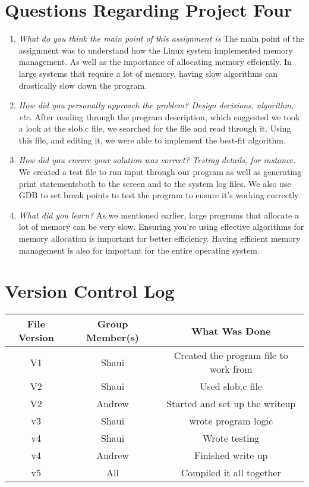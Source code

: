 \section{Questions Regarding Project Four}
\begin{enumerate}

   \item \textit{What do you think the main point of this assignment is} The main point of the assignment was to understand how the Linux system implemented memory management. As well as the importance of allocating memory effciently. In large systems that require a lot of memory, having slow algorithms can drastically slow down the program. 

   \item \textit{How did you personally approach the problem? Design decisions, algorithm, etc.} After reading through the program description, which suggested we took a look at the slob.c file, we searched for the file and read through it. Using this file, and editing it, we were able to implement the best-fit algorithm. 

   \item \textit{How did you ensure your solution was correct? Testing details, for instance.} We created a test file to run input through our program as well as generating print statementsboth to the screen and to the system log files. We also use GDB to set break points to test the program to ensure it's working correctly. 

   \item \textit{What did you learn?} As we mentioned earlier, large programs that allocate a lot of memory can be very slow. Ensuring you're using effective algorithms for memory allocation is important for better efficiency. Having efficient memory management is also for important for the entire operating system.  
\end{enumerate}


\section{Version Control Log}
\begin{center}
\begin{tabular}{ |c|c|c| }
   File Version & Group Member(s) & What Was Done \\
   \hline \hline
   V1 & Shaui & Created the program file to work from \\
   \hline
   V2 & Shaui & Used slob.c file\\
   \hline
   V2 & Andrew & Started and set up the writeup\\
   \hline
   v3 & Shaui  & wrote program logic \\
   \hline
   v4 & Shaui & Wrote testing \\
   \hline
   v4 & Andrew & Finished write up \\
   \hline 
   v5 & All & Compiled it all together\\
   \hline
\end{tabular}
\end{center}

